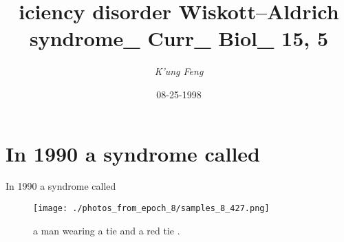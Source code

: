 \documentclass{article}%
\title{iciency disorder Wiskott–Aldrich syndrome\_ Curr\_ Biol\_ 15, 5}%
\author{\textit{K'ung Feng}}%
\date{08-25-1998}%
\begin{document}
%
\normalsize%
\maketitle%
\section{In 1990 a syndrome called                                                                                                                                                                                                                                                                                                                                                                                                                                                                                                                                                                                                                                                                                                                                                                                                                                                                                                                                                                                                 }%
\label{sec:In1990asyndromecalled}%
In 1990 a syndrome called                                                                                                                                                                                                                                                                                                                                                                                                                                                                                                                                                                                                                                                                                                                                                                                                                                                                                                                                                                                                 

%


\begin{figure}[h!]%
\centering%
\texttt{[image: ./photos\_from\_epoch\_8/samples\_8\_427.png]}%
\caption{a man wearing a tie and a red tie .}%
\end{figure}

%
\end{document}
